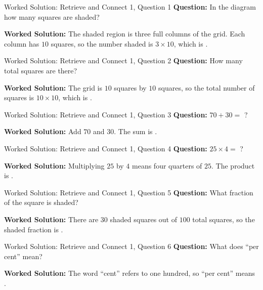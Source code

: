 \documentclass{beamer}
\newcommand{\ablank}[1]{%
  \alt<2>{\textcolor{red}{#1}}{\underline{\phantom{#1}}}%
}
\begin{document}
\begin{frame}[t]{Worked Solution: Retrieve and Connect 1, Question 1}
\hypertarget{work-st1}{}
\textbf{Question:} In the diagram how many squares are shaded?

\smallskip
\textbf{Worked Solution:} The shaded region is three full columns of the grid. Each column has \(10\) squares, so the number shaded is \(3 \times 10\), which is \ablank{$30$}.
\end{frame}

\begin{frame}[t]{Worked Solution: Retrieve and Connect 1, Question 2}
\textbf{Question:} How many total squares are there?

\smallskip
\textbf{Worked Solution:} The grid is \(10\) squares by \(10\) squares, so the total number of squares is \(10 \times 10\), which is \ablank{$100$}.
\end{frame}

\begin{frame}[t]{Worked Solution: Retrieve and Connect 1, Question 3}
\textbf{Question:} \(70 + 30 =\) ?

\smallskip
\textbf{Worked Solution:} Add \(70\) and \(30\). The sum is \ablank{$100$}.
\end{frame}

\begin{frame}[t]{Worked Solution: Retrieve and Connect 1, Question 4}
\textbf{Question:} \(25 \times 4 =\) ?

\smallskip
\textbf{Worked Solution:} Multiplying \(25\) by \(4\) means four quarters of \(25\). The product is \ablank{$100$}.
\end{frame}

\begin{frame}[t]{Worked Solution: Retrieve and Connect 1, Question 5}
\textbf{Question:} What fraction of the square is shaded?

\smallskip
\textbf{Worked Solution:} There are \(30\) shaded squares out of \(100\) total squares, so the shaded fraction is \ablank{$\tfrac{30}{100}$}.
\end{frame}

\begin{frame}[t]{Worked Solution: Retrieve and Connect 1, Question 6}
\textbf{Question:} What does ``per cent'' mean?

\smallskip
\textbf{Worked Solution:} The word ``cent'' refers to one hundred, so ``per cent'' means \ablank{out of 100}.
\end{frame}
\end{document}

